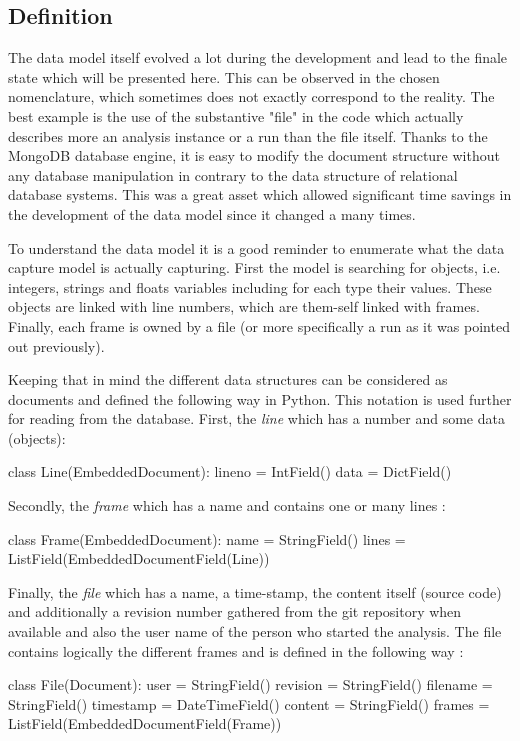 \subsection{Definition}
The data model itself evolved a lot during the development and lead to the finale state which will be presented here. This can be observed in the chosen nomenclature, which sometimes does not exactly correspond to the reality. The best example is the use of the substantive "file" in the code which actually describes more an analysis instance or a run than the file itself. Thanks to the MongoDB database engine, it is easy to modify the document structure without any database manipulation in contrary to the data structure of relational database systems. This was a great asset which allowed significant time savings in the development of the data model since it changed a many times.

To understand the data model it is a good reminder to enumerate what the data capture model is actually capturing. First the model is searching for objects, i.e. integers, strings and floats variables including for each type their values. These objects are linked with line numbers, which are them-self linked with frames. Finally, each frame is owned by a file (or more specifically a run as it was pointed out previously).

Keeping that in mind the different data structures can be considered as documents and defined the following way in Python. This notation is used further for reading from the database. First, the \textit{line} which has a number and some data (objects):
\begin{python}
class Line(EmbeddedDocument):
    lineno = IntField()
    data = DictField()
\end{python}

Secondly, the \textit{frame} which has a name and contains one or many lines :

\begin{python}
class Frame(EmbeddedDocument):
    name = StringField()
    lines = ListField(EmbeddedDocumentField(Line))
\end{python}

Finally, the \textit{file} which has a name, a time-stamp, the content itself (source code) and additionally a revision number gathered from the git repository when available and also the user name of the person who started the analysis. The file contains logically the different frames and is defined in the following way :
\begin{python}
class File(Document):
    user = StringField()
    revision = StringField()
    filename = StringField()
    timestamp = DateTimeField()
    content = StringField()
    frames = ListField(EmbeddedDocumentField(Frame))
\end{python}

